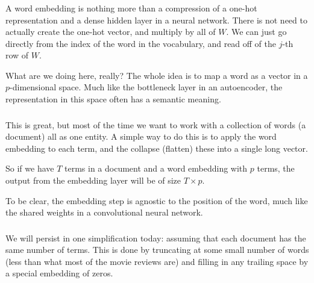 \documentclass[xetex,mathserif,serif,aspectratio=169]{beamer}
\begin{document}
\begin{frame}[fragile] \frametitle{} \oldB \small


A word embedding is nothing more than a compression of a one-hot
representation and a dense hidden layer in a neural network. There
is not need to actually create the one-hot vector, and multiply by
all of $W$. We can just go directly from the index of the word in
the vocabulary, and read off of the $j$-th row of $W$.

\pause What are we doing here, really? The whole idea is to map a word as
a vector in a $p$-dimensional space. Much like the bottleneck layer
in an autoencoder, the representation in this space often has a
semantic meaning.

\end{frame}

\begin{frame}[fragile] \frametitle{} \oldB \small


This is great, but most of the time we want to work with
a collection of words (a document) all as one entity. A
simple way to do this is to apply the word embedding to
each term, and the collapse (flatten) these into a single
long vector.

So if we have $T$ terms in a document and a word embedding
with $p$ terms, the output from the embedding layer will be
of size $T \times p$.

To be clear, the embedding step is agnostic to the position
of the word, much like the shared weights in a convolutional
neural network.

\end{frame}


\begin{frame}[fragile] \frametitle{} \oldB \small


We will persist in one simplification today: assuming that
each document has the same number of terms. This is done by
truncating at some small number of words (less than what
most of the movie reviews are) and filling in any trailing
space by a special embedding of zeros.

\end{frame}
\end{document}
